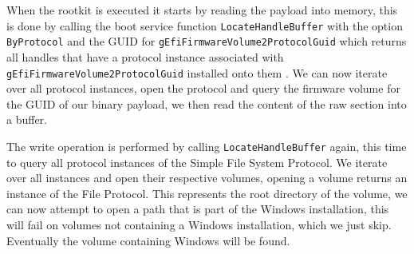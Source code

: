 When the rootkit is executed it starts by reading the payload into memory, this is done by calling the boot service function \lstinline{LocateHandleBuffer} with the option \lstinline{ByProtocol} and the GUID for \lstinline{gEfiFirmwareVolume2ProtocolGuid} which returns all handles that have a protocol instance associated with \lstinline{gEfiFirmwareVolume2ProtocolGuid} installed onto them \cite[7.3]{uefi-spec}. We can now iterate over all protocol instances, open the protocol and query the firmware volume for the GUID of our binary payload, we then read the content of the raw section into a buffer. 



The write operation is performed by calling \lstinline{LocateHandleBuffer} again, this time to query all protocol instances of the Simple File System Protocol. We iterate over all instances and open their respective volumes, opening a volume returns an instance of the File Protocol. This represents the root directory of the volume, we can now attempt to open a path that is part of the Windows installation, this will fail on volumes not containing a Windows installation, which we just skip. Eventually the volume containing Windows will be found.


